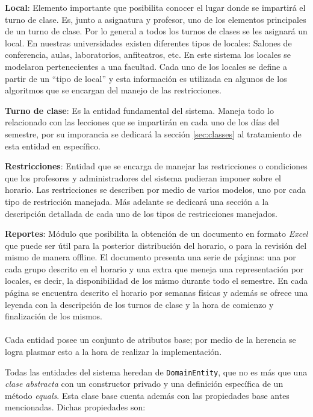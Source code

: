 \textbf{Local}: Elemento importante que posibilita conocer el lugar donde se impartirá el turno de clase. Es, junto a asignatura y profesor, uno de los elementos principales de un turno de clase. Por lo general a todos los turnos de clases se les
asignará un local. En nuestras universidades existen diferentes tipos de locales: Salones de conferencia,
aulas, laboratorios, anfiteatros, etc. En este sistema los locales se modelaron pertenecientes a una facultad.
Cada uno de los locales se define a partir de un “tipo de local” y esta información es utilizada en algunos de
los algoritmos que se encargan del manejo de las restricciones.

\textbf{Turno de clase}: Es la entidad fundamental del sistema. Maneja todo lo relacionado con las lecciones que se impartirán en cada uno de los días del semestre, por su imporancia se dedicará la sección \ref{sec:classes} al tratamiento de esta entidad en específico.

\textbf{Restricciones}: Entidad que se encarga de manejar las restricciones o condiciones que los profesores y administradores del sistema pudieran imponer sobre el horario. Las restricciones se describen por medio de varios modelos, uno por cada tipo de restricción manejada. Más adelante se dedicará una sección a la descripción detallada de cada uno de los tipos de restricciones manejados.

\textbf{Reportes}: Módulo que posibilita la obtención de un documento en formato \textit{Excel} que puede ser útil para la posterior distribución del horario, o para la revisión del mismo de manera offline. El documento presenta una serie de páginas: una por cada grupo descrito en el horario y una extra que meneja una representación por locales, es decir, la disponibilidad de los mismo durante todo el semestre. En cada página se encuentra descrito el horario por semanas físicas y además se ofrece una leyenda con la descripción de los turnos de clase y la hora de comienzo y finalización de los mismos.\\\\


Cada entidad posee un conjunto de atributos base; por medio de la herencia se logra plasmar esto a la hora de realizar la implementación. 

Todas las entidades del sistema heredan de \texttt{DomainEntity}, que no es más que una \textit{clase abstracta} con un constructor privado y una definición específica de un método \textit{equals}. Esta clase base cuenta además con las propiedades base antes mencionadas. Dichas propiedades son:


